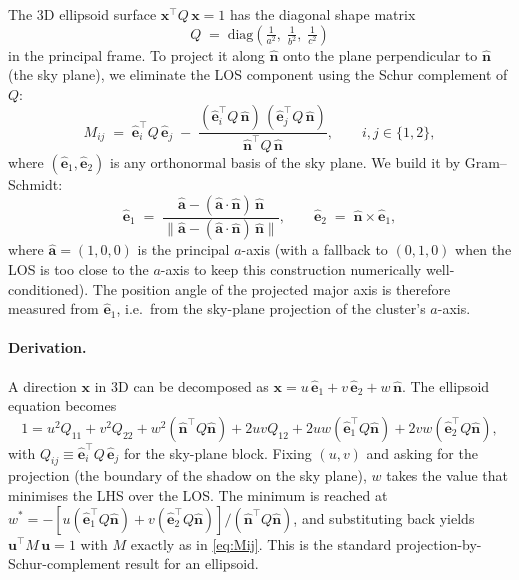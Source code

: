 \documentclass[11pt,a4paper]{article}
\newcommand{\unitvec}[1]{\hat{\mathbf{#1}}}
\begin{document}
The 3D ellipsoid surface $\mathbf{x}^\top Q\, \mathbf{x} = 1$ has the
diagonal shape matrix
\begin{equation}
Q \;=\; \mathrm{diag}\!\left(\tfrac{1}{a^2},\;\tfrac{1}{b^2},\;\tfrac{1}{c^2}\right)
\end{equation}
in the principal frame. To project it along $\unitvec{n}$ onto the
plane perpendicular to $\unitvec{n}$ (the sky plane), we eliminate the
LOS component using the Schur complement of $Q$:
\begin{equation}
M_{ij} \;=\; \unitvec{e}_i^\top Q\,\unitvec{e}_j
            \;-\; \frac{(\unitvec{e}_i^\top Q\,\unitvec{n})\,
                          (\unitvec{e}_j^\top Q\,\unitvec{n})}
                        {\unitvec{n}^\top Q\,\unitvec{n}},
\qquad i,j \in \{1, 2\},
\label{eq:Mij}
\end{equation}
where $(\unitvec{e}_1, \unitvec{e}_2)$ is any orthonormal basis of the
sky plane. We build it by Gram--Schmidt:
\begin{equation}
\unitvec{e}_1 \;=\;
   \frac{\unitvec{a} - (\unitvec{a}\cdot\unitvec{n})\,\unitvec{n}}
        {\|\unitvec{a} - (\unitvec{a}\cdot\unitvec{n})\,\unitvec{n}\|},
\qquad
\unitvec{e}_2 \;=\; \unitvec{n} \times \unitvec{e}_1,
\end{equation}
where $\unitvec{a}=(1,0,0)$ is the principal $a$-axis (with a fallback
to $(0,1,0)$ when the LOS is too close to the $a$-axis to keep this
construction numerically well-conditioned). The position angle of the
projected major axis is therefore measured from $\unitvec{e}_1$, i.e.\
from the sky-plane projection of the cluster's $a$-axis.

\paragraph{Derivation.}
A direction $\mathbf{x}$ in 3D can be decomposed as
$\mathbf{x} = u\,\unitvec{e}_1 + v\,\unitvec{e}_2 + w\,\unitvec{n}$.
The ellipsoid equation becomes
\begin{equation}
1 = u^2 Q_{11} + v^2 Q_{22} + w^2 (\unitvec{n}^\top Q \unitvec{n})
   + 2 u v Q_{12} + 2 u w (\unitvec{e}_1^\top Q \unitvec{n})
   + 2 v w (\unitvec{e}_2^\top Q \unitvec{n}),
\end{equation}
with $Q_{ij} \equiv \unitvec{e}_i^\top Q\, \unitvec{e}_j$ for the
sky-plane block. Fixing $(u, v)$ and asking for the projection (the
boundary of the shadow on the sky plane), $w$ takes the value that
minimises the LHS over the LOS. The minimum is reached at
$w^* = -[u(\unitvec{e}_1^\top Q\unitvec{n}) + v(\unitvec{e}_2^\top Q\unitvec{n})]/(\unitvec{n}^\top Q\unitvec{n})$,
and substituting back yields $\mathbf{u}^\top M\, \mathbf{u} = 1$ with
$M$ exactly as in \eqref{eq:Mij}. This is the standard projection-by-
Schur-complement result for an ellipsoid.
\end{document}

